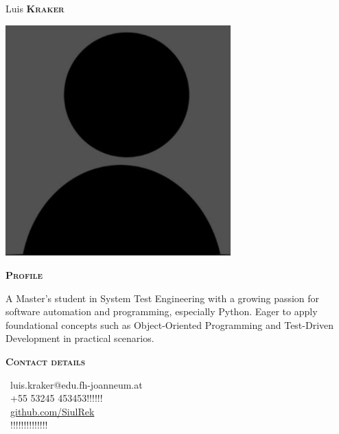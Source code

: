 \documentclass[11pt, a4paper]{article}
\newcommand{\headleft}[1]{\vspace*{3ex}\textsc{\textbf{#1}}\par%
    \vspace*{-1.5ex}\hrulefill\par\vspace*{0.7ex}}
\begin{document}
\setlength{\topskip}{0pt}
\setlength{\parindent}{0pt}
\setlength{\parskip}{0pt}
\setlength{\fboxsep}{0pt}
\pagestyle{empty}
\raggedbottom

\begin{minipage}[t]{0.33\textwidth} 
\colorbox{brown}{\begin{minipage}[t][5mm][t]{\textwidth}\null\hfill\null\end{minipage}}
\vspace{-.2ex} 
\colorbox{brown!90}{\color{white}
\textwidth\relax
\begin{minipage}[t][293mm][t]{0.805\textwidth\relax}
\raggedright
\vspace*{2.5ex}

\Large Luis \textbf{\textsc{Kraker}} \normalsize 

\null\hfill\includegraphics[width=0.65\textwidth]{profile_photo.png}\hfill\null

\vspace*{0.5ex} %

\headleft{Profile}
A Master's student in System Test Engineering with a growing passion for software automation and programming, especially Python. Eager to apply foundational concepts such as Object-Oriented Programming and Test-Driven Development in practical scenarios.

\headleft{Contact details}
\small
\MVAt\ {\small luis.kraker@edu.fh-joanneum.at} \\[0.4ex]
\Mobilefone\ +55 53245 453453!!!!!! \\[0.5ex]
\Mundus\ \href{https://github.com/SiulRek}{github.com/SiulRek} \\[0.1ex]
\Letter\ !!!!!!!!!!!!!!
\normalsize


\end{minipage}}
\end{minipage}
\end{document}
